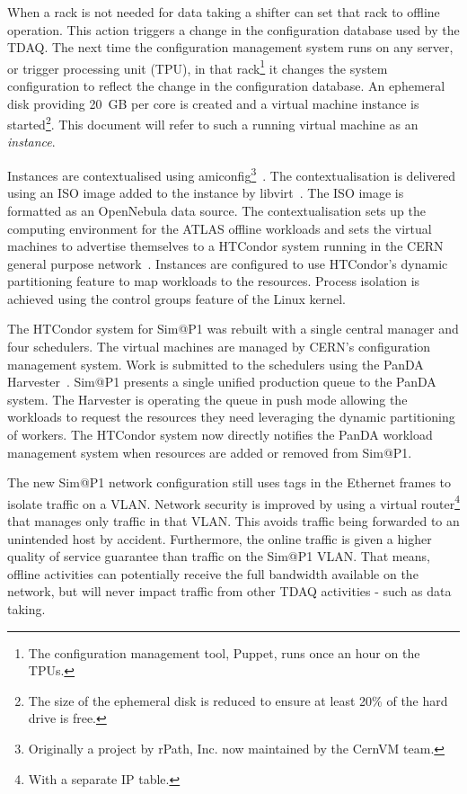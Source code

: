 \documentclass{webofc}
\begin{document}
When a rack is not needed for data taking a shifter can set that rack to
offline operation. This action triggers a change in the configuration database
used by the TDAQ. The next time the configuration management system runs on any
server, or trigger processing unit (TPU), in that rack\footnote{The
configuration management tool, Puppet, runs once an hour on the TPUs.} it
changes the system configuration to reflect the change in the configuration
database. An ephemeral disk providing 20~\textrm{GB} per core is
created and a virtual machine instance is started\footnote{The size of the
ephemeral disk is reduced to ensure at least 20\% of the hard drive is free.}.
This document will refer to such a running virtual machine as an
\textit{instance}.

Instances are contextualised using amiconfig\footnote{Originally a
project by rPath, Inc. now maintained by the CernVM team.}~\cite{amiconfig}.
The contextualisation is delivered using an ISO image added to the instance
by libvirt~\cite{libvirt}. The ISO image is formatted as an OpenNebula data
source. The contextualisation sets up the computing environment for the ATLAS
offline workloads and sets the virtual machines to advertise themselves to a
HTCondor system running in the CERN general purpose network~\cite{condor}.
Instances are configured to use HTCondor's dynamic partitioning feature to
map workloads to the resources. Process isolation is achieved using the control
groups feature of the Linux kernel.

The HTCondor system for Sim@P1 was rebuilt with a single central manager and
four schedulers. The virtual machines are managed by CERN's configuration
management system. Work is submitted to the schedulers using the PanDA
Harvester~\cite{harvester}. Sim@P1 presents a single unified production queue to
the PanDA system. The Harvester is operating the queue in push mode allowing the
workloads to request the resources they need leveraging the dynamic partitioning
of workers.  The HTCondor system now directly notifies the PanDA workload
management system when resources are added or removed from Sim@P1.

The new Sim@P1 network configuration still uses tags in the Ethernet frames to
isolate traffic on a VLAN. Network security is improved by using a virtual
router\footnote{With a separate IP table.} that manages only traffic in that
VLAN. This avoids traffic being forwarded to an unintended host by accident.
Furthermore, the online traffic is given a higher quality of service guarantee
than traffic on the Sim@P1 VLAN. That means, offline activities can potentially
receive the full bandwidth available on the network, but will never impact
traffic from other TDAQ activities - such as data taking.
\end{document}
